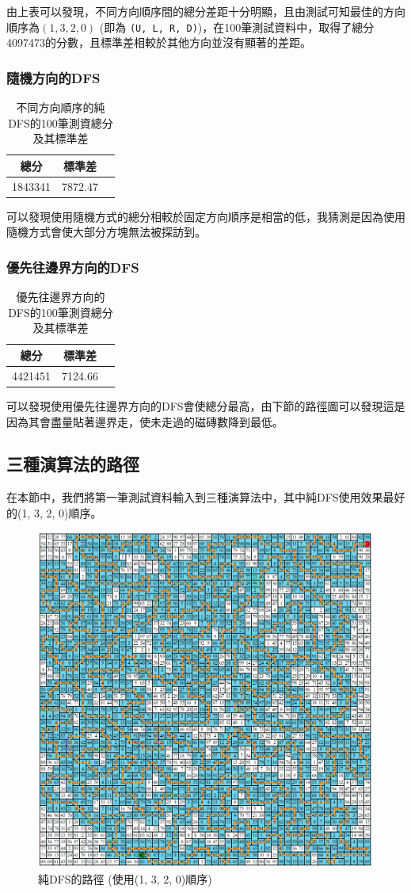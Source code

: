 \documentclass[12pt, a4paper]{article}
\begin{document}
由上表可以發現，不同方向順序間的總分差距十分明顯，且由測試可知最佳的方向順序為$(1, 3, 2, 0)$ (即為 \texttt{(U, L, R, D)})，在100筆測試資料中，取得了總分4097473的分數，且標準差相較於其他方向並沒有顯著的差距。

\subsubsection{隨機方向的DFS}
\begin{table}[H]
\caption{不同方向順序的純DFS的100筆測資總分及其標準差}
\label{tab:my-table}
\centering
\begin{tabular}{@{}ccc@{}}
\toprule
\textbf{總分} & \textbf{標準差} \\ \midrule
1843341     & 7872.47    \\
 \bottomrule
\end{tabular}
\end{table}

可以發現使用隨機方式的總分相較於固定方向順序是相當的低，我猜測是因為使用隨機方式會使大部分方塊無法被探訪到。
\subsubsection{優先往邊界方向的DFS}
\begin{table}[H]
\caption{優先往邊界方向的DFS的100筆測資總分及其標準差}
\label{tab:my-table}
\centering
\begin{tabular}{@{}ccc@{}}
\toprule
\textbf{總分} & \textbf{標準差} \\ \midrule
4421451     & 7124.66      \\
\bottomrule
\end{tabular}
\end{table}

可以發現使用優先往邊界方向的DFS會使總分最高，由下節的路徑圖可以發現這是因為其會盡量貼著邊界走，使未走過的磁磚數降到最低。

\subsection{三種演算法的路徑}
在本節中，我們將第一筆測試資料輸入到三種演算法中，其中純DFS使用效果最好的(1, 3, 2, 0)順序。

\begin{figure}[H]
    \centering
    \includegraphics[width=0.6\linewidth]{path_dfs.png}
    \caption{純DFS的路徑 (使用(1, 3, 2, 0)順序)}
\end{figure}
\end{document}

